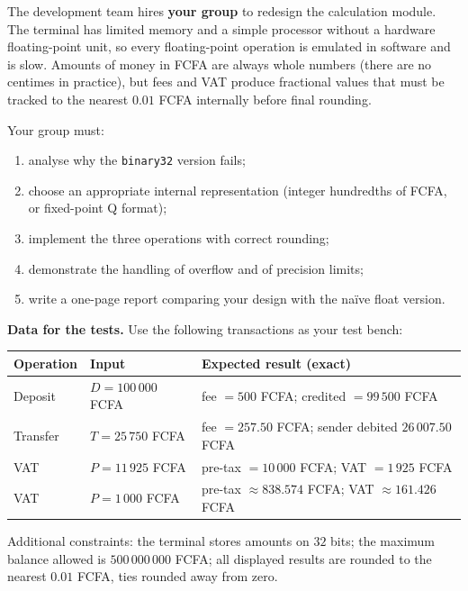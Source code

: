 \documentclass[11pt]{article}
\begin{document}
The development team hires \textbf{your group} to redesign the calculation module. The terminal has limited memory and a simple processor without a hardware floating-point unit, so every floating-point operation is emulated in software and is slow. Amounts of money in FCFA are always whole numbers (there are no centimes in practice), but fees and VAT produce fractional values that must be tracked to the nearest $0.01$ FCFA internally before final rounding.

Your group must:
\begin{enumerate}
\item analyse why the \texttt{binary32} version fails;
\item choose an appropriate internal representation (integer hundredths of FCFA, or fixed-point Q format);
\item implement the three operations with correct rounding;
\item demonstrate the handling of overflow and of precision limits;
\item write a one-page report comparing your design with the na\"ive float version.
\end{enumerate}

\textbf{Data for the tests.} Use the following transactions as your test bench:

\begin{center}
\begin{tabularx}{\linewidth}{|l|X|X|}\hline
\rowcolor{popblueL} \textbf{Operation} & \textbf{Input} & \textbf{Expected result (exact)} \\ \hline
Deposit & $D = 100\,000$ FCFA & fee $= 500$ FCFA; credited $= 99\,500$ FCFA \\ \hline
Transfer & $T = 25\,750$ FCFA & fee $= 257.50$ FCFA; sender debited $26\,007.50$ FCFA \\ \hline
VAT & $P = 11\,925$ FCFA & pre-tax $= 10\,000$ FCFA; VAT $= 1\,925$ FCFA \\ \hline
VAT & $P = 1\,000$ FCFA & pre-tax $\approx 838.574$ FCFA; VAT $\approx 161.426$ FCFA \\ \hline
\end{tabularx}
\end{center}

Additional constraints: the terminal stores amounts on $32$ bits; the maximum balance allowed is $500\,000\,000$ FCFA; all displayed results are rounded to the nearest $0.01$ FCFA, ties rounded away from zero.
\end{document}
